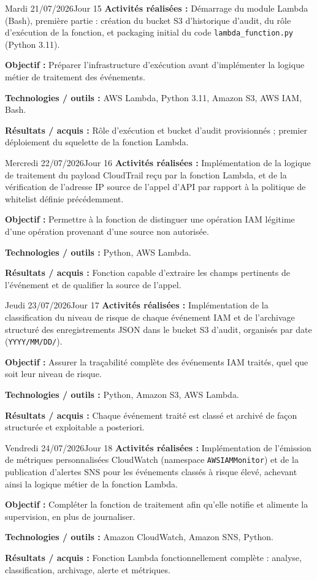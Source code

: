 \documentclass[11pt,a4paper]{article}
\newcommand{\journalfield}[2]{{\color{primaryblue}\textbf{#1 :}} #2\par\smallskip}
\begin{document}
\begin{journalday}{Mardi 21/07/2026}{Jour 15}
\journalfield{Activités réalisées}{Démarrage du module Lambda (Bash), première partie : création du bucket S3 d'historique d'audit, du rôle d'exécution de la fonction, et packaging initial du code \texttt{lambda\_function.py} (Python 3.11).}
\journalfield{Objectif}{Préparer l'infrastructure d'exécution avant d'implémenter la logique métier de traitement des événements.}
\journalfield{Technologies / outils}{AWS Lambda, Python 3.11, Amazon S3, AWS IAM, Bash.}
\journalfield{Résultats / acquis}{Rôle d'exécution et bucket d'audit provisionnés ; premier déploiement du squelette de la fonction Lambda.}
\end{journalday}

\begin{journalday}{Mercredi 22/07/2026}{Jour 16}
\journalfield{Activités réalisées}{Implémentation de la logique de traitement du payload CloudTrail reçu par la fonction Lambda, et de la vérification de l'adresse IP source de l'appel d'API par rapport à la politique de whitelist définie précédemment.}
\journalfield{Objectif}{Permettre à la fonction de distinguer une opération IAM légitime d'une opération provenant d'une source non autorisée.}
\journalfield{Technologies / outils}{Python, AWS Lambda.}
\journalfield{Résultats / acquis}{Fonction capable d'extraire les champs pertinents de l'événement et de qualifier la source de l'appel.}
\end{journalday}

\begin{journalday}{Jeudi 23/07/2026}{Jour 17}
\journalfield{Activités réalisées}{Implémentation de la classification du niveau de risque de chaque événement IAM et de l'archivage structuré des enregistrements JSON dans le bucket S3 d'audit, organisés par date (\texttt{YYYY/MM/DD/}).}
\journalfield{Objectif}{Assurer la traçabilité complète des événements IAM traités, quel que soit leur niveau de risque.}
\journalfield{Technologies / outils}{Python, Amazon S3, AWS Lambda.}
\journalfield{Résultats / acquis}{Chaque événement traité est classé et archivé de façon structurée et exploitable a posteriori.}
\end{journalday}

\begin{journalday}{Vendredi 24/07/2026}{Jour 18}
\journalfield{Activités réalisées}{Implémentation de l'émission de métriques personnalisées CloudWatch (namespace \texttt{AWSIAMMonitor}) et de la publication d'alertes SNS pour les événements classés à risque élevé, achevant ainsi la logique métier de la fonction Lambda.}
\journalfield{Objectif}{Compléter la fonction de traitement afin qu'elle notifie et alimente la supervision, en plus de journaliser.}
\journalfield{Technologies / outils}{Amazon CloudWatch, Amazon SNS, Python.}
\journalfield{Résultats / acquis}{Fonction Lambda fonctionnellement complète : analyse, classification, archivage, alerte et métriques.}
\end{journalday}
\end{document}
